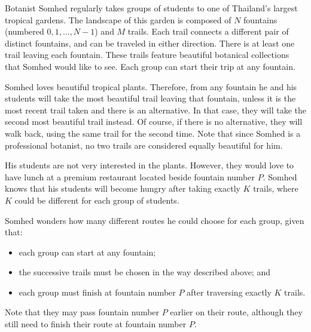 Botanist Somhed regularly takes groups of students to one of Thailand's largest tropical gardens. The landscape of this garden is composed of $N$ fountains (numbered $0, 1, \ldots, N-1$) and $M$ trails. Each trail connects a different pair of distinct fountains, and can be traveled in either direction. There is at least one trail leaving each fountain. These trails feature beautiful botanical collections that Somhed would like to see. Each group can start their trip at any fountain.


Somhed loves beautiful tropical plants. Therefore, from any fountain he and his students will take the most beautiful trail leaving that fountain, unless it is the most recent trail taken and there is an alternative. In that case, they will take the second most beautiful trail instead. Of course, if there is no alternative, they will walk back, using the same trail for the second time. Note that since Somhed is a professional botanist, no two trails are considered equally beautiful for him.

His students are not very interested in the plants. However, they would love to have lunch at a premium restaurant located beside fountain number $P$. Somhed knows that his students will become hungry after taking exactly $K$ trails, where $K$ could be different for each group of students.

Somhed wonders how many different routes he could choose for each group, given that:
\begin{itemize}
\item each group can start at any fountain;
\item the successive trails must be chosen in the way described above; and
\item each group must finish at fountain number $P$ after traversing exactly $K$ trails.
\end{itemize}

Note that they may pass fountain number $P$ earlier on their route, although they still need to finish their route at fountain number $P$.

